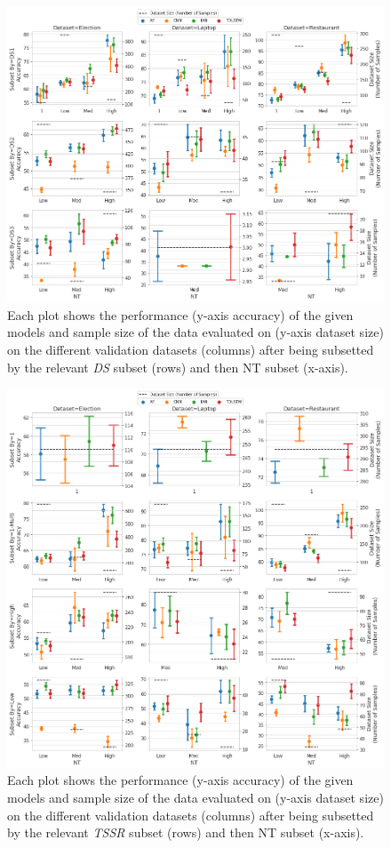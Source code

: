 \begin{figure}[ht!]
    \centering
    \includegraphics[scale=0.35]{images/augmentation/methods_performance/baseline/baseline_ds_nt_validation_scores.png}
    \caption{Each plot shows the performance (y-axis accuracy) of the given models and sample size of the data evaluated on (y-axis dataset size) on the different validation datasets (columns) after being subsetted by the relevant \textit{DS} subset (rows) and then NT subset (x-axis).}
    \label{fig:aug_baseline_ds_nt_validation_scores}
\end{figure}
\begin{figure}[ht!]
    \centering
    \includegraphics[scale=0.35]{images/augmentation/methods_performance/baseline/baseline_tssr_nt_validation_scores.png}
    \caption{Each plot shows the performance (y-axis accuracy) of the given models and sample size of the data evaluated on (y-axis dataset size) on the different validation datasets (columns) after being subsetted by the relevant \textit{TSSR} subset (rows) and then NT subset (x-axis).}
    \label{fig:aug_baseline_tssr_nt_validation_scores}
\end{figure}